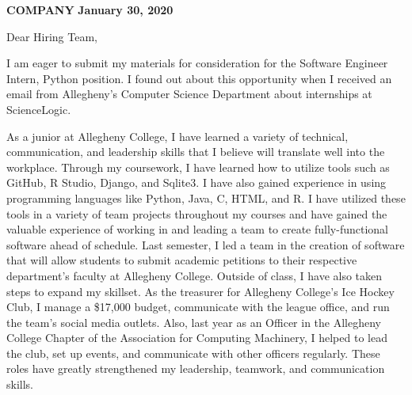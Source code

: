 \documentclass[10pt,a4paper]{altacv}
\begin{document}

\begin{fullwidth}
\makecvheader
\end{fullwidth}



\newline
\textbf{COMPANY}
\hfill
\textbf{January 30, 2020}

\newline
\medskip

Dear Hiring Team,

\medskip

I am eager to submit my materials for consideration for the Software Engineer Intern, Python position. I found out about this opportunity when I received an email from Allegheny's Computer Science Department about internships at ScienceLogic.

\smallskip

As a junior at Allegheny College, I have learned a variety of technical, communication, and leadership skills that I believe will translate well into the workplace. Through my coursework, I have learned how to utilize tools such as GitHub, R Studio, Django, and Sqlite3. I have also gained experience in using programming languages like Python, Java, C, HTML, and R. I have utilized these tools in a variety of team projects throughout my courses and have gained the valuable experience of working in and leading a team to create fully-functional software ahead of schedule. Last semester, I led a team in the creation of software that will allow students to submit academic petitions to their respective department's faculty at Allegheny College. Outside of class, I have also taken steps to expand my skillset. As the treasurer for Allegheny College’s Ice Hockey Club, I manage a \$17,000 budget, communicate with the league office, and run the team's social media outlets. Also, last year as an Officer in the Allegheny College Chapter of the Association for Computing Machinery, I helped to lead the club, set up events, and communicate with other officers regularly. These roles have greatly strengthened my leadership, teamwork, and communication skills.
\end{document}
